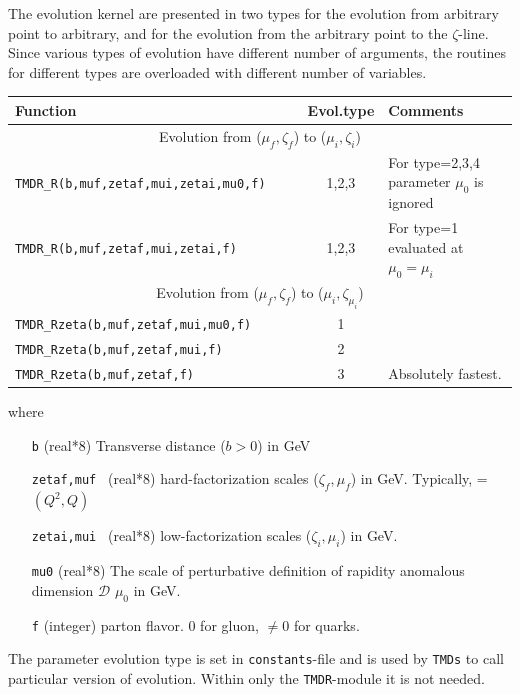 \documentclass[prd,nofootinbib,eqsecnum,final]{revtex4}
\renewcommand{\(}{\left(}
\renewcommand{\)}{\right)}
\renewcommand{\[}{\left[}
\renewcommand{\]}{\right]}
\begin{document}
The evolution kernel are presented in two types for the evolution from arbitrary point to arbitrary, and for the evolution from the arbitrary point to the $\zeta$-line. Since various types of evolution have different number of arguments, the routines for different types are overloaded with different number of variables.

\begin{center}

\begin{tabular}{|l||c|l|}
Function & Evol.type & Comments
\\\hline\hline
\multicolumn{3}{|c|}{Evolution from ($\mu_f,\zeta_f$) to ($\mu_i,\zeta_i$)}
\\\hline
\texttt{TMDR{\_}R(b,muf,zetaf,mui,zetai,mu0,f)}~~~~ & 1,2,3& For type=2,3,4 parameter $\mu_0$ is ignored
\\\hline
\texttt{TMDR{\_}R(b,muf,zetaf,mui,zetai,f)}~~~~ & 1,2,3& For type=1 evaluated at $\mu_0=\mu_i$
\\\hline\hline
\multicolumn{3}{|c|}{Evolution from ($\mu_f,\zeta_f$) to ($\mu_i,\zeta_{\mu_i}$)}
\\\hline
\texttt{TMDR{\_}Rzeta(b,muf,zetaf,mui,mu0,f)}~~~~ &  1& 
\\\hline
\texttt{TMDR{\_}Rzeta(b,muf,zetaf,mui,f)}~~~~ &  2& 
\\\hline
\texttt{TMDR{\_}Rzeta(b,muf,zetaf,f)}~~~~ & 3& Absolutely fastest.
\end{tabular}
\end{center}

where 
\begin{itemize}
\item [\texttt{b}] (real*8) Transverse distance ($b>0$) in GeV
\item [\texttt{zetaf,muf }] (real*8) hard-factorization scales ($\zeta_f,\mu_f$) in GeV. Typically, =$(Q^2,Q)$
\item [\texttt{zetai,mui }] (real*8) low-factorization scales ($\zeta_i,\mu_i$) in GeV.
\item [\texttt{mu0}] (real*8) The scale of perturbative definition of rapidity anomalous dimension $\mathcal{D}$ $\mu_0$ in GeV. 
\item [\texttt{f}] (integer) parton flavor. $0$ for gluon, $\neq 0$ for quarks.
\end{itemize}

The parameter evolution type is set in \texttt{constants}-file and is used by \texttt{TMDs} to call particular version of evolution. Within only the \texttt{TMDR}-module it is not needed.
\end{document}
